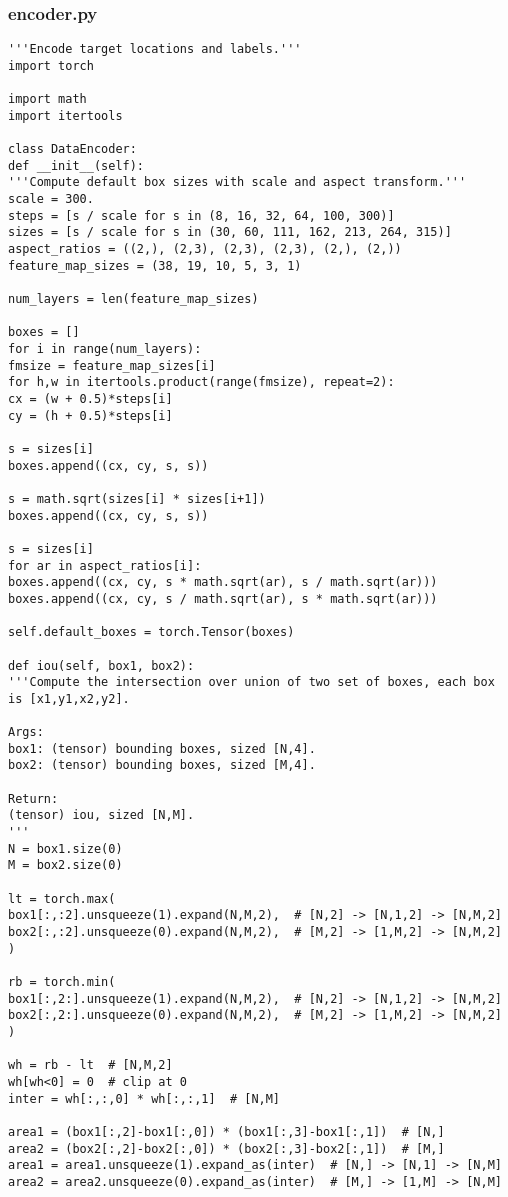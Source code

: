 \subsubsection*{encoder.py}
\begin{lstlisting}
'''Encode target locations and labels.'''
import torch

import math
import itertools

class DataEncoder:
def __init__(self):
'''Compute default box sizes with scale and aspect transform.'''
scale = 300.
steps = [s / scale for s in (8, 16, 32, 64, 100, 300)]
sizes = [s / scale for s in (30, 60, 111, 162, 213, 264, 315)]
aspect_ratios = ((2,), (2,3), (2,3), (2,3), (2,), (2,))
feature_map_sizes = (38, 19, 10, 5, 3, 1)

num_layers = len(feature_map_sizes)

boxes = []
for i in range(num_layers):
fmsize = feature_map_sizes[i]
for h,w in itertools.product(range(fmsize), repeat=2):
cx = (w + 0.5)*steps[i]
cy = (h + 0.5)*steps[i]

s = sizes[i]
boxes.append((cx, cy, s, s))

s = math.sqrt(sizes[i] * sizes[i+1])
boxes.append((cx, cy, s, s))

s = sizes[i]
for ar in aspect_ratios[i]:
boxes.append((cx, cy, s * math.sqrt(ar), s / math.sqrt(ar)))
boxes.append((cx, cy, s / math.sqrt(ar), s * math.sqrt(ar)))

self.default_boxes = torch.Tensor(boxes)

def iou(self, box1, box2):
'''Compute the intersection over union of two set of boxes, each box is [x1,y1,x2,y2].

Args:
box1: (tensor) bounding boxes, sized [N,4].
box2: (tensor) bounding boxes, sized [M,4].

Return:
(tensor) iou, sized [N,M].
'''
N = box1.size(0)
M = box2.size(0)

lt = torch.max(
box1[:,:2].unsqueeze(1).expand(N,M,2),  # [N,2] -> [N,1,2] -> [N,M,2]
box2[:,:2].unsqueeze(0).expand(N,M,2),  # [M,2] -> [1,M,2] -> [N,M,2]
)

rb = torch.min(
box1[:,2:].unsqueeze(1).expand(N,M,2),  # [N,2] -> [N,1,2] -> [N,M,2]
box2[:,2:].unsqueeze(0).expand(N,M,2),  # [M,2] -> [1,M,2] -> [N,M,2]
)

wh = rb - lt  # [N,M,2]
wh[wh<0] = 0  # clip at 0
inter = wh[:,:,0] * wh[:,:,1]  # [N,M]

area1 = (box1[:,2]-box1[:,0]) * (box1[:,3]-box1[:,1])  # [N,]
area2 = (box2[:,2]-box2[:,0]) * (box2[:,3]-box2[:,1])  # [M,]
area1 = area1.unsqueeze(1).expand_as(inter)  # [N,] -> [N,1] -> [N,M]
area2 = area2.unsqueeze(0).expand_as(inter)  # [M,] -> [1,M] -> [N,M]


\end{lstlisting}
